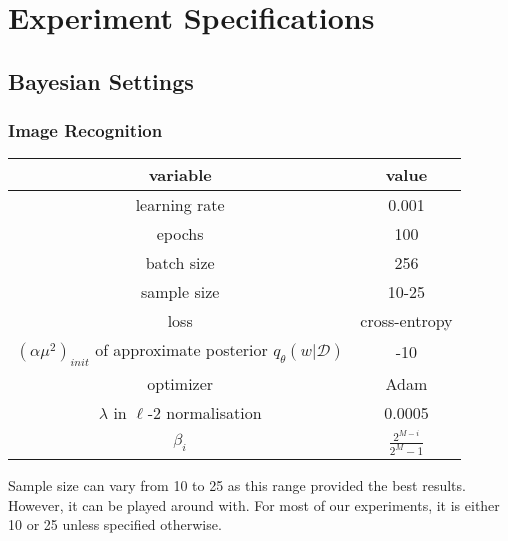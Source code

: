 \chapter{Experiment Specifications} 

\section*{Bayesian Settings}

\subsection{Image Recognition}

\begin{table}[H]
    \centering
    \renewcommand{\arraystretch}{2}
    \begin{tabular}[c]{c | c} 
     \hline
     variable & value \\ [0.5ex] 
     \hline
     learning rate &  0.001\\ 
     
     epochs & 100 \\
     
     batch size & 256 \\
     
     sample size & 10-25 \\
     
     loss & cross-entropy \\
     
     $(\alpha \mu^2)_{init}$ of approximate posterior $q_{\theta}(w|\mathcal{D})$ & -10 \\
     
     optimizer & Adam \cite{kingma2014adam} \\
     
     $\lambda$ in $\ell$-2 normalisation & 0.0005 \\
    
     $\beta_i$ & $\frac{2^{M-i}}{2^M-1}$ \cite{blundell2015weight} \\ [1ex] 
     \hline
    \end{tabular} 
    \renewcommand{\arraystretch}{2}
\end{table}

Sample size can vary from 10 to 25 as this range provided the best results. However, it can be played around with. For most of our experiments, it is either 10 or 25 unless specified otherwise. 

